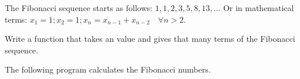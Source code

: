 \begin{Exercise}[title={Fibonacci},difficulty=1]
\label{ex:fibonaci}
\Question\label{ex:fibonaci q1}
The Fibonacci sequence starts as follows: $1, 1, 2, 3, 5, 8, 13, \ldots$
Or in mathematical terms: $ x_1 = 1; x_2 = 1; x_n = x_{n-1} +
x_{n-2}\quad\forall n > 2 $.

Write a function that takes an  value and gives 
that many terms of the Fibonacci sequence.

\end{Exercise}

\begin{Answer}
\Question
The following program calculates the Fibonacci numbers.


\showremarks
\end{Answer}
